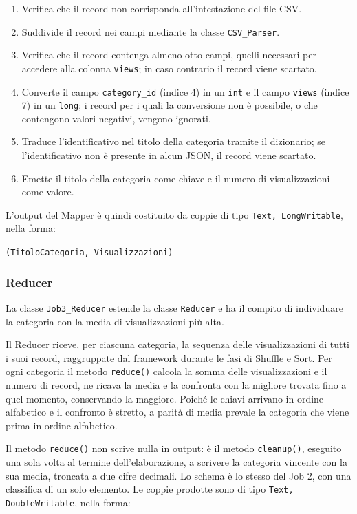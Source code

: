 \documentclass[12pt, a4paper]{article}
\begin{document}
\begin{enumerate}
    \item Verifica che il record non corrisponda
    all'intestazione del file CSV.
    \item Suddivide il record nei campi mediante
    la classe \texttt{CSV\_Parser}.
    \item Verifica che il record contenga almeno otto campi,
    quelli necessari per accedere alla colonna \texttt{views};
    in caso contrario il record viene scartato.
    \item Converte il campo \texttt{category\_id} (indice 4)
    in un \texttt{int} e il campo \texttt{views} (indice 7)
    in un \texttt{long}; i record per i quali la conversione
    non è possibile, o che contengono valori negativi,
    vengono ignorati.
    \item Traduce l'identificativo nel titolo della categoria
    tramite il dizionario; se l'identificativo non è presente
    in alcun JSON, il record viene scartato.
    \item Emette il titolo della categoria come chiave
    e il numero di visualizzazioni come valore.
\end{enumerate}

L'output del Mapper è quindi costituito da coppie
di tipo \texttt{Text, LongWritable}, nella forma:

\begin{center}
    \texttt{(TitoloCategoria, Visualizzazioni)}
\end{center}

\subsubsection{Reducer}

La classe \texttt{Job3\_Reducer} estende la classe
\texttt{Reducer} e ha il compito di individuare
la categoria con la media di visualizzazioni più alta.

Il Reducer riceve, per ciascuna categoria, la sequenza
delle visualizzazioni di tutti i suoi record, raggruppate
dal framework durante le fasi di Shuffle e Sort.
Per ogni categoria il metodo \texttt{reduce()} calcola
la somma delle visualizzazioni e il numero di record,
ne ricava la media e la confronta con la migliore
trovata fino a quel momento, conservando la maggiore.
Poiché le chiavi arrivano in ordine alfabetico e il
confronto è stretto, a parità di media prevale
la categoria che viene prima in ordine alfabetico.

Il metodo \texttt{reduce()} non scrive nulla in output:
è il metodo \texttt{cleanup()}, eseguito una sola volta
al termine dell'elaborazione, a scrivere la categoria
vincente con la sua media, troncata a due cifre decimali.
Lo schema è lo stesso del Job 2, con una classifica
di un solo elemento.
Le coppie prodotte sono di tipo \texttt{Text, DoubleWritable},
nella forma:
\end{document}
